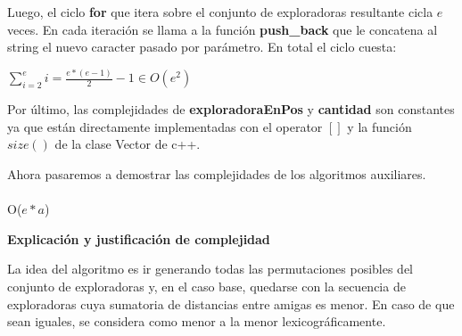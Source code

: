 \documentclass[spanish,a4paper]{article}
\begin{document}
Luego, el ciclo \textbf{for} que itera sobre el conjunto de exploradoras resultante cicla $e$ veces. En cada
iteración se llama a la función \textbf{push\_back} que le concatena al string el nuevo caracter pasado por parámetro.
En total el ciclo cuesta:

\begin{center}
$\sum\limits_{i=2}^e i = \frac{e*(e-1)}{2} - 1 \in O(e^2)$
\end{center}

Por último, las complejidades de \textbf{exploradoraEnPos} y \textbf{cantidad} son constantes ya que están
directamente implementadas con el operator $[]$ y la función $size()$ de la clase Vector de c++.

Ahora pasaremos a demostrar las complejidades de los algoritmos auxiliares.
\\ \\
\noindent\makebox[\linewidth]{\rule{17cm}{0.4pt}}
 {O($e*a$)}

\vspace{3mm}
\begin{center}
\textbf{Explicación y justificación de complejidad} \\ 
\end{center} 

La idea del algoritmo es ir generando todas las permutaciones posibles del conjunto de exploradoras y, en el 
caso base, quedarse con la secuencia de exploradoras cuya sumatoria de distancias entre 
amigas es menor. En caso de que sean iguales, se considera como menor a la menor lexicográficamente. 
\end{document}
